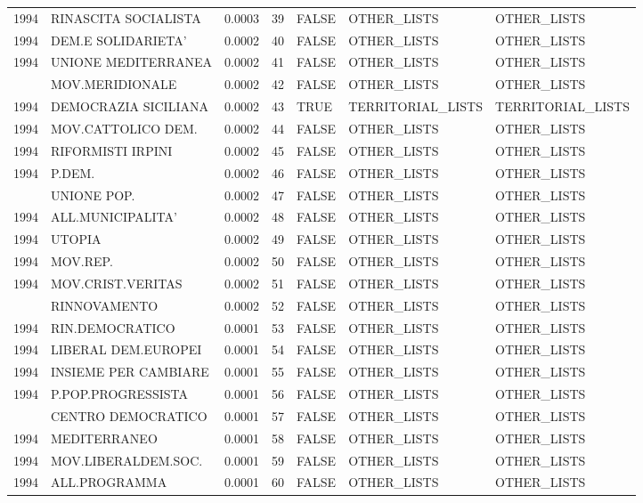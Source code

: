 \begin{longtable}[t]{rlrrlll}
1994 & RINASCITA SOCIALISTA & 0.0003 & 39 & FALSE & OTHER\_LISTS & OTHER\_LISTS\\
1994 & DEM.E SOLIDARIETA' & 0.0002 & 40 & FALSE & OTHER\_LISTS & OTHER\_LISTS\\
1994 & UNIONE MEDITERRANEA & 0.0002 & 41 & FALSE & OTHER\_LISTS & OTHER\_LISTS\\
\addlinespace
1994 & MOV.MERIDIONALE & 0.0002 & 42 & FALSE & OTHER\_LISTS & OTHER\_LISTS\\
1994 & DEMOCRAZIA SICILIANA & 0.0002 & 43 & TRUE & TERRITORIAL\_LISTS & TERRITORIAL\_LISTS\\
1994 & MOV.CATTOLICO DEM. & 0.0002 & 44 & FALSE & OTHER\_LISTS & OTHER\_LISTS\\
1994 & RIFORMISTI IRPINI & 0.0002 & 45 & FALSE & OTHER\_LISTS & OTHER\_LISTS\\
1994 & P.DEM. & 0.0002 & 46 & FALSE & OTHER\_LISTS & OTHER\_LISTS\\
\addlinespace
1994 & UNIONE POP. & 0.0002 & 47 & FALSE & OTHER\_LISTS & OTHER\_LISTS\\
1994 & ALL.MUNICIPALITA' & 0.0002 & 48 & FALSE & OTHER\_LISTS & OTHER\_LISTS\\
1994 & UTOPIA & 0.0002 & 49 & FALSE & OTHER\_LISTS & OTHER\_LISTS\\
1994 & MOV.REP. & 0.0002 & 50 & FALSE & OTHER\_LISTS & OTHER\_LISTS\\
1994 & MOV.CRIST.VERITAS & 0.0002 & 51 & FALSE & OTHER\_LISTS & OTHER\_LISTS\\
\addlinespace
1994 & RINNOVAMENTO & 0.0002 & 52 & FALSE & OTHER\_LISTS & OTHER\_LISTS\\
1994 & RIN.DEMOCRATICO & 0.0001 & 53 & FALSE & OTHER\_LISTS & OTHER\_LISTS\\
1994 & LIBERAL DEM.EUROPEI & 0.0001 & 54 & FALSE & OTHER\_LISTS & OTHER\_LISTS\\
1994 & INSIEME PER CAMBIARE & 0.0001 & 55 & FALSE & OTHER\_LISTS & OTHER\_LISTS\\
1994 & P.POP.PROGRESSISTA & 0.0001 & 56 & FALSE & OTHER\_LISTS & OTHER\_LISTS\\
\addlinespace
1994 & CENTRO DEMOCRATICO & 0.0001 & 57 & FALSE & OTHER\_LISTS & OTHER\_LISTS\\
1994 & MEDITERRANEO & 0.0001 & 58 & FALSE & OTHER\_LISTS & OTHER\_LISTS\\
1994 & MOV.LIBERALDEM.SOC. & 0.0001 & 59 & FALSE & OTHER\_LISTS & OTHER\_LISTS\\
1994 & ALL.PROGRAMMA & 0.0001 & 60 & FALSE & OTHER\_LISTS & OTHER\_LISTS\\

\end{longtable}
